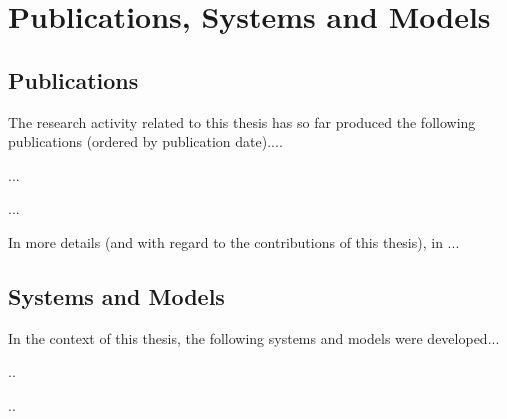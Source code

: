 
\chapter{Publications, Systems and Models}
\label{app:pubs}




\section*{Publications}

The research activity related to this thesis has so far produced the
following publications (ordered by publication date)....

\begin{compactitem}
\item[(1)] ...
\item[(2)] ...
\end{compactitem}


\vspace{3mm} \noindent In more details (and with regard to the
contributions of this thesis), in ...


\section*{Systems and Models}

In the context of this thesis, the following systems and models were
developed...
\begin{compactitem}
\item   ..
\item   ..
\end{compactitem}
